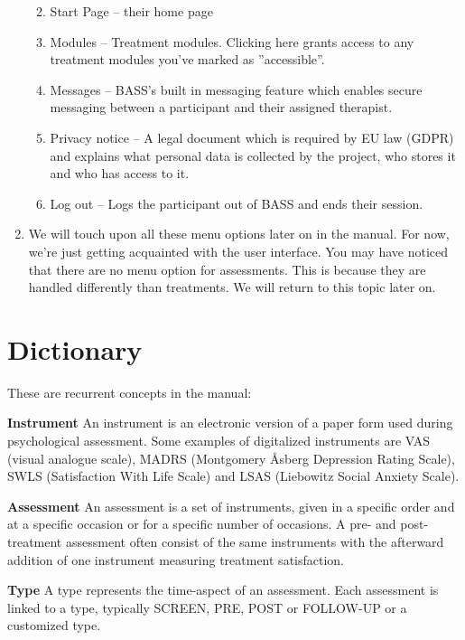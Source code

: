 \documentclass[]{book}
\providecommand{\tightlist}{%
  \setlength{\itemsep}{0pt}\setlength{\parskip}{0pt}}
\begin{document}
\begin{enumerate}
  \begin{enumerate}
  \def\labelenumii{\arabic{enumii}.}
  \tightlist
  \item
    Start Page -- their home page
  \item
    Modules -- Treatment modules. Clicking here grants access to any treatment modules you've marked as ''accessible''.
  \item
    Messages -- BASS's built in messaging feature which enables secure messaging between a participant and their assigned therapist.
  \item
    Privacy notice -- A legal document which is required by EU law (GDPR) and explains what personal data is collected by the project, who stores it and who has access to it.
  \item
    Log out -- Logs the participant out of BASS and ends their session.
  \end{enumerate}
\item
  We will touch upon all these menu options later on in the manual. For now, we're just getting acquainted with the user interface. You may have noticed that there are no menu option for assessments. This is because they are handled differently than treatments. We will return to this topic later on.
\end{enumerate}

\hypertarget{dictionary}{%
\chapter{Dictionary}\label{dictionary}}

These are recurrent concepts in the manual:

\textbf{Instrument}
An instrument is an electronic version of a paper form used during psychological assessment. Some examples of digitalized instruments are VAS (visual analogue scale), MADRS (Montgomery Åsberg Depression Rating Scale), SWLS (Satisfaction With Life Scale) and LSAS (Liebowitz Social Anxiety Scale).

\textbf{Assessment}
An assessment is a set of instruments, given in a specific order and at a specific occasion or for a specific number of occasions. A pre- and post-treatment assessment often consist of the same instruments with the afterward addition of one instrument measuring treatment satisfaction.

\textbf{Type}
A type represents the time-aspect of an assessment. Each assessment is linked to a type, typically SCREEN, PRE, POST or FOLLOW-UP or a customized type.
\end{document}
